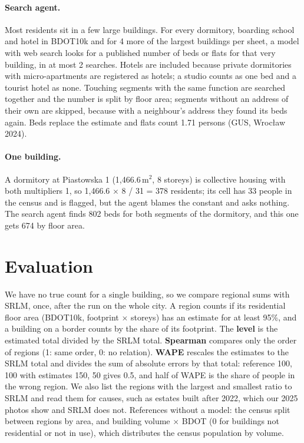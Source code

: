 \documentclass[11pt]{article}
\begin{document}
\paragraph{Search agent.}
Most residents sit in a few large buildings.
For every dormitory, boarding school and hotel in BDOT10k and for 4 more of the largest buildings per sheet, a model with web search looks for a published number of beds or flats for that very building, in at most 2 searches.
Hotels are included because private dormitories with micro-apartments are registered as hotels; a studio counts as one bed and a tourist hotel as none.
Touching segments with the same function are searched together and the number is split by floor area; segments without an address of their own are skipped, because with a neighbour's address they found its beds again.
Beds replace the estimate and flats count 1.71 persons (GUS, Wrocław 2024).

\paragraph{One building.}
A dormitory at Piastowska 1 (1,466.6\,m$^2$, 8 storeys) is collective housing with both multipliers 1, so 1,466.6 $\times$ 8 / 31 = 378 residents; its cell has 33 people in the census and is flagged, but the agent blames the constant and asks nothing.
The search agent finds 802 beds for both segments of the dormitory, and this one gets 674 by floor area.

\section{Evaluation}

We have no true count for a single building, so we compare regional sums with SRLM, once, after the run on the whole city.
A region counts if its residential floor area (BDOT10k, footprint $\times$ storeys) has an estimate for at least 95\%, and a building on a border counts by the share of its footprint.
The \textbf{level} is the estimated total divided by the SRLM total.
\textbf{Spearman} compares only the order of regions (1: same order, 0: no relation).
\textbf{WAPE} rescales the estimates to the SRLM total and divides the sum of absolute errors by that total: reference 100, 100 with estimates 150, 50 gives 0.5, and half of WAPE is the share of people in the wrong region.
We also list the regions with the largest and smallest ratio to SRLM and read them for causes, such as estates built after 2022, which our 2025 photos show and SRLM does not.
References without a model: the census split between regions by area, and building volume $\times$ BDOT (0 for buildings not residential or not in use), which distributes the census population by volume.
\end{document}
